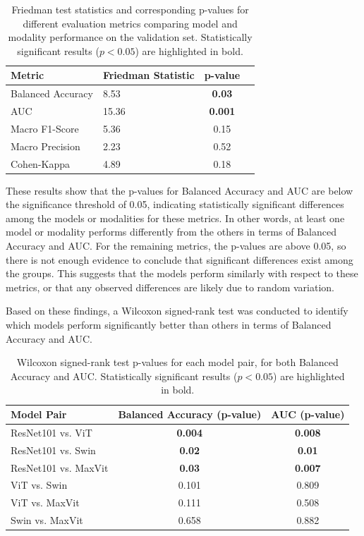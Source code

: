 \documentclass[a4paper,10pt]{book}
\begin{document}
\begin{table}[h!]
  \centering
\caption[Summary of Friedman test statistics and p-values for all evaluation metrics.]{Friedman test statistics and corresponding p-values for different evaluation metrics comparing model and modality performance on the validation set. Statistically significant results ($p < 0.05$) are highlighted in bold.}
  \label{tab:friedman_test_results}
  \begin{tabular}{l l c c}
    \toprule
    \textbf{Metric} & \textbf{Friedman Statistic} & \textbf{p-value} \\
    \midrule
    Balanced Accuracy & 8.53 & \textbf{0.03}  \\
    AUC  & 15.36  &  \textbf{0.001 }\\
    Macro F1-Score    &  5.36  & 0.15 \\
    Macro Precision & 2.23 &  0.52 \\
    Cohen-Kappa & 4.89 & 0.18 \\
    \bottomrule
  \end{tabular}
\end{table}


These results show that the p-values for Balanced Accuracy and AUC are below the significance threshold of 0.05, indicating statistically significant differences among the models or modalities for these metrics. In other words, at least one model or modality performs differently from the others in terms of Balanced Accuracy and AUC. For the remaining metrics, the p-values are above 0.05, so there is not enough evidence to conclude that significant differences exist among the groups. This suggests that the models perform similarly with respect to these metrics, or that any observed differences are likely due to random variation.

Based on these findings, a Wilcoxon signed-rank test was conducted to identify which models perform significantly better than others in terms of Balanced Accuracy and AUC.

\begin{table}[h!]
  \centering
  \caption[Wilcoxon signed-rank test p-values for each model pair.]{Wilcoxon signed-rank test p-values for each model pair, for both Balanced Accuracy and AUC. Statistically significant results ($p < 0.05$) are highlighted in bold.}
  \label{tab:wilcoxon_pvalues}
  \begin{tabular}{@{}lcc@{}}
    \toprule
    \textbf{Model Pair} & \textbf{Balanced Accuracy (p-value)} & \textbf{AUC (p-value)} \\
    \midrule
    ResNet101 vs. ViT      & \textbf{0.004} & \textbf{0.008} \\
    ResNet101 vs. Swin     & \textbf{0.02} & \textbf{0.01} \\
    ResNet101 vs. MaxVit   & \textbf{0.03} & \textbf{0.007} \\
    ViT vs. Swin           & 0.101 & 0.809 \\
    ViT vs. MaxVit         & 0.111 & 0.508 \\
    Swin vs. MaxVit        & 0.658 & 0.882 \\
    \bottomrule
  \end{tabular}
\end{table}
\end{document}
